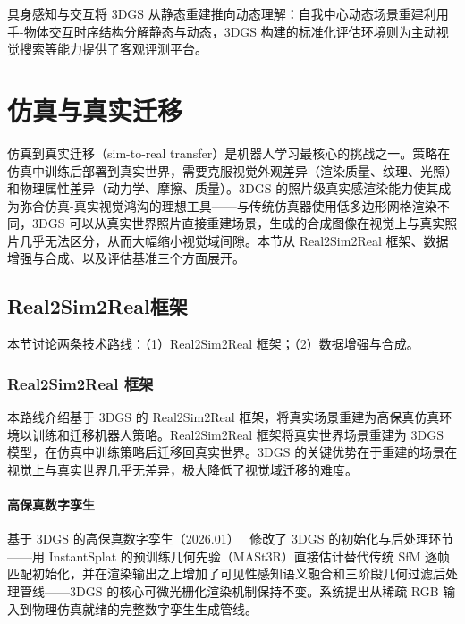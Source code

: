 \begin{takeaway}
具身感知与交互将 3DGS 从静态重建推向动态理解：自我中心动态场景重建利用手-物体交互时序结构分解静态与动态，3DGS 构建的标准化评估环境则为主动视觉搜索等能力提供了客观评测平台。
\end{takeaway}

\section{仿真与真实迁移}
\label{sec:17_4}

仿真到真实迁移（sim-to-real transfer）是机器人学习最核心的挑战之一。策略在仿真中训练后部署到真实世界，需要克服视觉外观差异（渲染质量、纹理、光照）和物理属性差异（动力学、摩擦、质量）。3DGS 的照片级真实感渲染能力使其成为弥合仿真-真实视觉鸿沟的理想工具——与传统仿真器使用低多边形网格渲染不同，3DGS 可以从真实世界照片直接重建场景，生成的合成图像在视觉上与真实照片几乎无法区分，从而大幅缩小视觉域间隙。本节从 Real2Sim2Real 框架、数据增强与合成、以及评估基准三个方面展开。

\subsection{Real2Sim2Real框架}
\label{ss:17_4a}

本节讨论两条技术路线：（1）Real2Sim2Real 框架；（2）数据增强与合成。

\subsubsection{Real2Sim2Real 框架}

本路线介绍基于 3DGS 的 Real2Sim2Real 框架，将真实场景重建为高保真仿真环境以训练和迁移机器人策略。Real2Sim2Real 框架将真实世界场景重建为 3DGS 模型，在仿真中训练策略后迁移回真实世界。3DGS 的关键优势在于重建的场景在视觉上与真实世界几乎无差异，极大降低了视觉域迁移的难度。

\paragraph{高保真数字孪生}

基于 3DGS 的高保真数字孪生（2026.01）~\cite{2601_03200} 修改了 3DGS 的初始化与后处理环节——用 InstantSplat 的预训练几何先验（MASt3R）直接估计替代传统 SfM 逐帧匹配初始化，并在渲染输出之上增加了可见性感知语义融合和三阶段几何过滤后处理管线——3DGS 的核心可微光栅化渲染机制保持不变。系统提出从稀疏 RGB 输入到物理仿真就绪的完整数字孪生生成管线。

